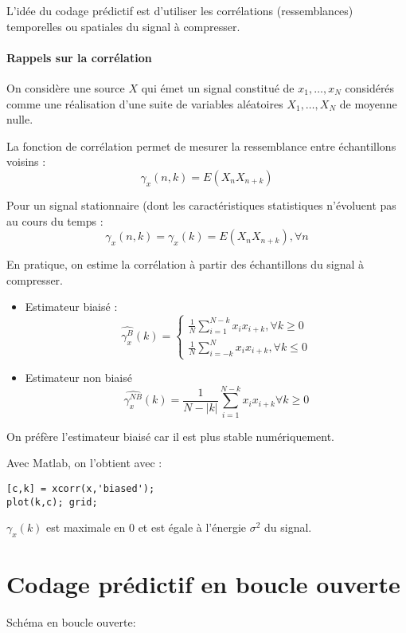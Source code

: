 \documentclass[main.tex]{subfiles}
\begin{document}
L'idée du codage prédictif est d'utiliser les corrélations (ressemblances) temporelles ou spatiales du signal à compresser.

\paragraph{Rappels sur la corrélation}

On considère une source $X$ qui émet un signal constitué de $x_1,\dots,x_N$ considérés comme une réalisation d'une suite de variables aléatoires $X_1,\dots,X_N$ de moyenne nulle.



La fonction de corrélation permet de mesurer la ressemblance entre échantillons voisins :
\[ \gamma_x(n,k) = E(X_nX_{n+k}) \]

Pour un signal stationnaire (dont les caractéristiques statistiques n'évoluent pas au cours du temps :
\[ \gamma_x(n,k) = \gamma_x(k) = E(X_nX_{n+k}), \forall n\]

En pratique, on estime la corrélation à partir des échantillons du signal à compresser.
\begin{itemize}
\item Estimateur biaisé :
\[ \hat{\gamma_x^{B}}(k) =
  \begin{cases}
\displaystyle\frac{1}{N}\sum_{i=1}^{N-k} x_i x_{i+k}, \forall k \geq 0 \\[2em]
\displaystyle\frac{1}{N} \sum_{i=-k}^N x_i x_{i+k}, \forall k \leq 0
\end{cases}
\]
\item Estimateur non biaisé
\[
  \hat{\gamma_x^{NB}}(k) =\frac{1}{N-|k|} \sum_{i=1}^{N-k} x_i x_{i+k} \forall k \geq 0
\]

\end{itemize}
\begin{rem}
  On préfère l'estimateur biaisé car il est plus stable numériquement.
\end{rem}
Avec Matlab, on l'obtient avec :
\begin{verbatim}
[c,k] = xcorr(x,'biased');
plot(k,c); grid;
\end{verbatim}

$\gamma_x(k)$ est maximale en 0 et est égale à l'énergie $\sigma^2$ du signal.
\section{Codage prédictif en boucle ouverte}
Schéma en boucle ouverte:
\end{document}
